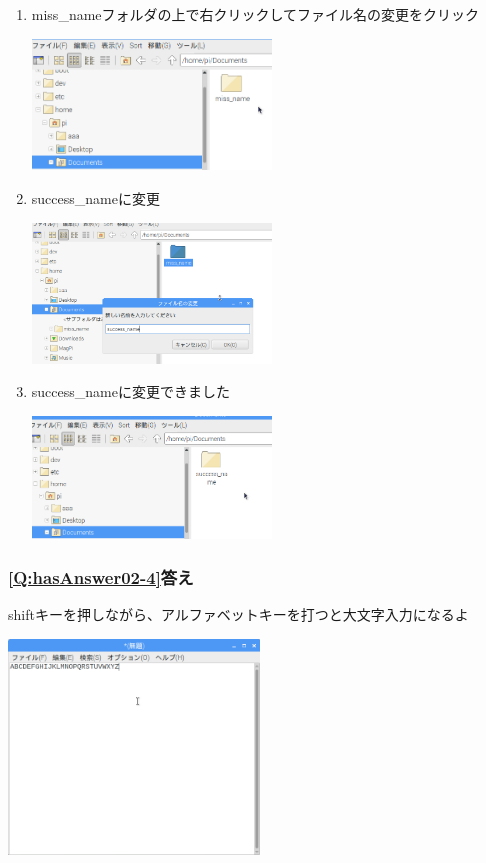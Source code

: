 \documentclass[a4paper,12pt]{jarticle}
\begin{document}
\begin{enumerate}
  \item
        miss\_nameフォルダの上で右クリックしてファイル名の変更をクリック

        \centering
        \includegraphics[width=0.5\textwidth]{textbook-img214.png}
        \flushleft

  \item success\_nameに変更

        \centering
        \includegraphics[width=0.5\textwidth]{textbook-img215.png}
        \flushleft
  \item success\_nameに変更できました

        \centering
        \includegraphics[width=0.5\textwidth]{textbook-img216.png}
        \flushleft
\end{enumerate}



\subsubsection{\bfseries
\ref*{Q:hasAnswer02-4}答え}

shiftキーを押しながら、アルファベットキーを打つと大文字入力になるよ


\centering
\includegraphics[width=0.5\textwidth]{textbook-img217.png}
\flushleft
\end{document}
